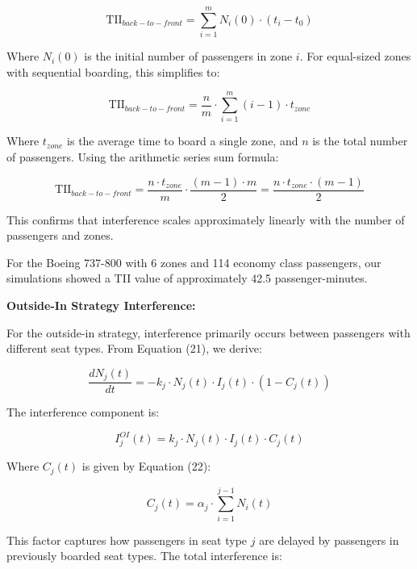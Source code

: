\begin{equation}
\text{TII}_{back-to-front} = \sum_{i=1}^{m} N_i(0) \cdot (t_i - t_0)
\end{equation}

Where $N_i(0)$ is the initial number of passengers in zone $i$. For equal-sized zones with sequential boarding, this simplifies to:

\begin{equation}
\text{TII}_{back-to-front} = \frac{n}{m} \cdot \sum_{i=1}^{m} (i-1) \cdot t_{zone}
\end{equation}

Where $t_{zone}$ is the average time to board a single zone, and $n$ is the total number of passengers. Using the arithmetic series sum formula:

\begin{equation}
\text{TII}_{back-to-front} = \frac{n \cdot t_{zone}}{m} \cdot \frac{(m-1) \cdot m}{2} = \frac{n \cdot t_{zone} \cdot (m-1)}{2}
\end{equation}

This confirms that interference scales approximately linearly with the number of passengers and zones.

For the Boeing 737-800 with 6 zones and 114 economy class passengers, our simulations showed a TII value of approximately 42.5 passenger-minutes.

\textbf{Outside-In Strategy Interference:}

For the outside-in strategy, interference primarily occurs between passengers with different seat types. From Equation (21), we derive:

\begin{equation}
\frac{dN_j(t)}{dt} = -k_j \cdot N_j(t) \cdot I_j(t) \cdot (1 - C_j(t))
\end{equation}

The interference component is:

\begin{equation}
I_j^{OI}(t) = k_j \cdot N_j(t) \cdot I_j(t) \cdot C_j(t)
\end{equation}

Where $C_j(t)$ is given by Equation (22):

\begin{equation}
C_j(t) = \alpha_j \cdot \sum_{i=1}^{j-1} N_i(t)
\end{equation}

This factor captures how passengers in seat type $j$ are delayed by passengers in previously boarded seat types. The total interference is:

